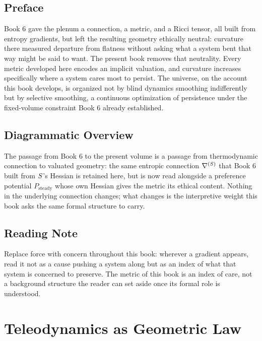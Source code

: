 \chapter*{Preface}

Book 6 gave the plenum a connection, a metric, and a Ricci tensor, all built from entropy gradients, but left the resulting geometry ethically neutral: curvature there measured departure from flatness without asking what a system bent that way might be said to want. The present book removes that neutrality. Every metric developed here encodes an implicit valuation, and curvature increases specifically where a system cares most to persist. The universe, on the account this book develops, is organized not by blind dynamics smoothing indifferently but by selective smoothing, a continuous optimization of persistence under the fixed-volume constraint Book 6 already established.

\chapter*{Diagrammatic Overview}

The passage from Book 6 to the present volume is a passage from thermodynamic connection to valuated geometry: the same entropic connection $\nabla^{(S)}$ that Book 6 built from $S$'s Hessian is retained here, but is now read alongside a preference potential $P_{\text{steady}}$ whose own Hessian gives the metric its ethical content. Nothing in the underlying connection changes; what changes is the interpretive weight this book asks the same formal structure to carry.

\chapter*{Reading Note}

Replace force with concern throughout this book: wherever a gradient appears, read it not as a cause pushing a system along but as an index of what that system is concerned to preserve. The metric of this book is an index of care, not a background structure the reader can set aside once its formal role is understood.

\part{Teleodynamics as Geometric Law}

